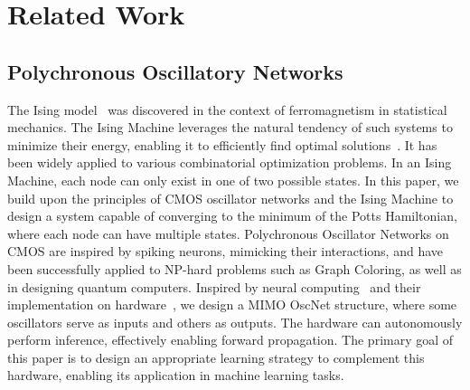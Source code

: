 \section{Related Work}
\subsection{Polychronous Oscillatory Networks}
The Ising model~\cite{ising_1,ising_2,ising_3,ising_4} was discovered in the context of ferromagnetism in statistical mechanics. The Ising Machine leverages the natural tendency of such systems to minimize their energy, enabling it to efficiently find optimal solutions~\cite{ising_solve_1,ising_solve_2,ising_solve_3,ising_solve_4}. It has been widely applied to various combinatorial optimization problems. In an Ising Machine, each node can only exist in one of two possible states.
In this paper, we build upon the principles of CMOS oscillator networks and the Ising Machine to design a system capable of converging to the minimum of the Potts Hamiltonian, where each node can have multiple states. Polychronous Oscillator Networks on CMOS are inspired by spiking neurons, mimicking their interactions, and have been successfully applied to NP-hard problems such as Graph Coloring, as well as in designing quantum computers.
Inspired by neural computing~\cite{neural_comp_1,neural_comp_2,neural_comp_3,neural_comp_4} and their implementation on hardware~\cite{circuit_learn_1,circuit_learn_2,circuit_learn_3}, we design a MIMO OscNet structure, where some oscillators serve as inputs and others as outputs. The hardware can autonomously perform inference, effectively enabling forward propagation. The primary goal of this paper is to design an appropriate learning strategy to complement this hardware, enabling its application in machine learning tasks.

